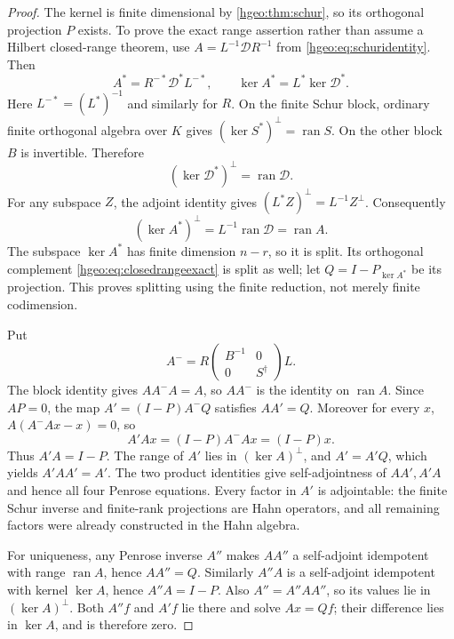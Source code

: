 \documentclass[11pt,letterpaper]{article}
\numberwithin{equation}{section}
\theoremstyle{definition}
\theoremstyle{remark}
\newcommand{\K}{K}
\newcommand{\ran}{\operatorname{ran}}
\begin{document}
\begin{proof}
The kernel is finite dimensional by \cref{hgeo:thm:schur}, so
its orthogonal projection $P$ exists. To prove the exact range
assertion rather than assume a Hilbert closed-range theorem, use
$A=L^{-1}\mathcal D R^{-1}$ from \eqref{hgeo:eq:schuridentity}. Then
\[
 A^*=R^{-*}\mathcal D^*L^{-*},\qquad
 \ker A^*=L^*\ker\mathcal D^*.
\]
Here $L^{-*}=(L^*)^{-1}$ and similarly for $R$. On the finite Schur
block, ordinary finite orthogonal algebra over $\K$ gives
$(\ker S^*)^\perp=\ran S$. On the other block $B$ is invertible.
Therefore
\[
 (\ker\mathcal D^*)^\perp=\ran\mathcal D.
\]
For any subspace $Z$, the adjoint identity gives
$(L^*Z)^\perp=L^{-1}Z^\perp$. Consequently
\begin{equation}\label{hgeo:eq:closedrangeexact}
 (\ker A^*)^\perp=L^{-1}\ran\mathcal D=\ran A.
\end{equation}
The subspace $\ker A^*$ has finite dimension $n-r$, so it is split.
Its orthogonal complement \eqref{hgeo:eq:closedrangeexact} is split
as well; let $Q=I-P_{\ker A^*}$ be its projection. This proves
splitting using the finite reduction, not merely finite codimension.

Put
\[
 A^-=R\begin{pmatrix}B^{-1}&0\\0&S^\dagger\end{pmatrix}L.
\]
The block identity gives $AA^-A=A$, so $AA^-$ is the identity on
$\ran A$. Since $AP=0$, the map
$A'=(I-P)A^-Q$ satisfies $AA'=Q$. Moreover for every $x$,
$A(A^-Ax-x)=0$, so
\[
 A'Ax=(I-P)A^-Ax=(I-P)x.
\]
Thus $A'A=I-P$. The range of $A'$ lies in $(\ker A)^\perp$, and
$A'=A'Q$, which yields $A'AA'=A'$. The two product identities give
self-adjointness of $AA',A'A$ and hence all four Penrose equations.
Every factor in $A'$ is adjointable: the finite Schur inverse and
finite-rank projections are Hahn operators, and all remaining
factors were already constructed in the Hahn algebra.

For uniqueness, any Penrose inverse $A''$ makes $AA''$ a
self-adjoint idempotent with range $\ran A$, hence $AA''=Q$.
Similarly $A''A$ is a self-adjoint idempotent with kernel $\ker A$,
hence $A''A=I-P$. Also $A''=A''AA''$, so its values lie in
$(\ker A)^\perp$. Both $A''f$ and $A'f$ lie there and solve
$Ax=Qf$; their difference lies in $\ker A$, and is therefore zero.
\end{proof}
\end{document}
